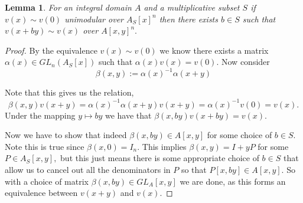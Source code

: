 \documentclass[12pt]{report}
\numberwithin{equation}{section}
\newcounter{dummy} \numberwithin{dummy}{section}
\newtheorem{lemma}[dummy]{Lemma}
\begin{document}
	\begin{lemma}\label{horrocksbutforlocal}
		For an integral domain $A$ and a multiplicative subset $S$ if $v(x) \sim v(0)$ unimodular over $A_S[x]^n $ then there exists $b \in S$ such that \\$v(x+by) \sim v(x) $ over $A[x,y]^n.$
	\end{lemma}
	\begin{proof}
		By the equivalence $v(x) \sim v(0)$ we know there exists a matrix $\alpha (x) \in GL_n(A_S[x])$ such that $\alpha(x)v(x)=v(0) $. Now consider \[ \beta(x,y) := \alpha(x)^{-1} \alpha(x+y) \]
		
		Note that this gives us the relation, $$\beta(x,y)v(x+y)=\alpha(x)^{-1}\alpha(x+y) v(x+y)=\alpha(x)^{-1}v(0)=v(x).$$ Under the mapping $y \mapsto by$ we have that $\beta(x,by)v(x+by)=v(x).$
		
		Now we have to show that indeed $\beta(x,by)\in A[x,y]$ for some choice of $b \in S$. Note this is true since $\beta(x,0)=I_n $. This implies $\beta(x,y)=I+yP $ for some $P \in A_S[x,y],$ but this just means there is some appropriate choice of $b \in S$ that allow us to cancel out all the denominators in $P$ so that $P[x,by] \in A[x,y]$. So with a choice of matrix $\beta(x,by) \in GL_A[x,y]$ we are done, as this forms an equivalence between $v(x+y) $  and $v(x).$
	\end{proof}
	
\end{document}
